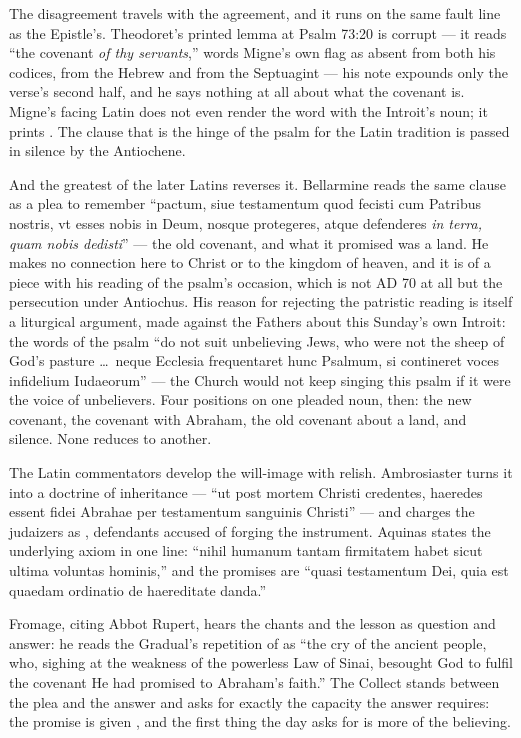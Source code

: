 The disagreement travels with the agreement, and it runs on the same fault line
as the Epistle's. Theodoret's printed lemma at Psalm 73:20 is corrupt --- it
reads ``the covenant \emph{of thy servants},'' words Migne's own  flag as absent from both his codices, from the Hebrew and from the
Septuagint --- his note expounds only the verse's second half, and he says
nothing at all about what the covenant is. Migne's facing Latin does not even
render the word with the Introit's noun; it prints . The clause
that is the hinge of the psalm for the Latin tradition is passed in silence by
the Antiochene.

And the greatest of the later Latins reverses it. Bellarmine reads the same
clause as a plea to remember ``pactum, siue testamentum quod fecisti cum
Patribus nostris, vt esses nobis in Deum, nosque protegeres, atque defenderes
\emph{in terra, quam nobis dedisti}'' --- the old covenant, and what it promised
was a land. He makes no connection here to Christ or to the kingdom of heaven,
and it is of a piece with his reading of the psalm's occasion, which is not AD
70 at all but the persecution under Antiochus. His reason for rejecting the
patristic reading is itself a liturgical argument, made against the Fathers
about this Sunday's own Introit: the words of the
psalm ``do not suit unbelieving Jews, who were not the sheep of God's pasture
\dots\ neque Ecclesia frequentaret hunc Psalmum, si contineret voces infidelium
Iudaeorum'' --- the Church would not keep singing this psalm if it were the
voice of unbelievers. Four positions on one pleaded noun, then: the new
covenant, the covenant with Abraham, the old covenant about a land, and
silence. None reduces to another.

The Latin commentators develop the will-image with relish. Ambrosiaster turns
it into a doctrine of inheritance --- ``ut post mortem Christi credentes,
haeredes essent fidei Abrahae per testamentum sanguinis Christi'' --- and
charges the judaizers as , defendants
accused of forging the instrument. Aquinas states the underlying axiom in one
line: ``nihil humanum tantam firmitatem habet sicut ultima voluntas hominis,''
and the promises are ``quasi testamentum Dei, quia est quaedam ordinatio de
haereditate danda.''

Fromage, citing Abbot Rupert, hears the chants and the lesson as question and
answer: he reads the Gradual's repetition of  as ``the cry
of the ancient people, who, sighing at the weakness of the powerless Law of
Sinai, besought God to fulfil the covenant He had promised to Abraham's
faith.'' The Collect stands between the plea and the answer and asks for
exactly the capacity the answer requires: the promise is given
, and the first thing the day asks for is more of the
believing.

